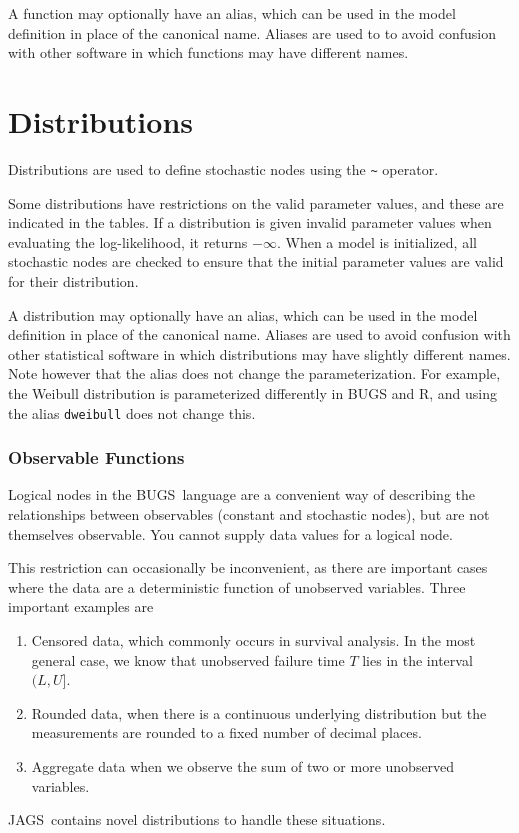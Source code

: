 \documentclass[11pt, a4paper, titlepage]{report}
\newcommand{\JAGS}{\textsf{JAGS}}
\newcommand{\BUGS}{\textsf{BUGS}}
\begin{document}
A function may optionally have an alias, which can be used in the
model definition in place of the canonical name. Aliases are used to
to avoid confusion with other software in which functions may have
different names.

\chapter{Distributions}
\label{chapter:distributions}

Distributions are used to define stochastic nodes using the \verb+~+
operator.

Some distributions have restrictions on the valid parameter values,
and these are indicated in the tables. If a distribution is
given invalid parameter values when evaluating the log-likelihood, it
returns $-\infty$. When a model is initialized, all stochastic nodes
are checked to ensure that the initial parameter values are valid for
their distribution.

A distribution may optionally have an alias, which can be used in the
model definition in place of the canonical name. Aliases are used to
avoid confusion with other statistical software in which distributions
may have slightly different names. Note however that the alias does
not change the parameterization. For example, the Weibull distribution
is parameterized differently in BUGS and R, and using the alias
\texttt{dweibull} does not change this.

\subsection{Observable Functions}
\label{section:obfun}

Logical nodes in the \BUGS\ language are a convenient way of
describing the relationships between observables (constant and
stochastic nodes), but are not themselves observable. You cannot
supply data values for a logical node.  

This restriction can occasionally be inconvenient, as there are
important cases where the data are a deterministic function of
unobserved variables.  Three important examples are
\begin{enumerate}
\item Censored data, which commonly occurs in survival analysis. In
the most general case, we know that unobserved failure time $T$
lies in the interval $(L,U]$.
\item Rounded data, when there is a continuous underlying distribution
but the measurements are rounded to a fixed number of decimal places.
\item Aggregate data when we observe the sum of two or more
unobserved variables.
\end{enumerate}
\JAGS\ contains novel distributions to handle these situations.  
\end{document}
